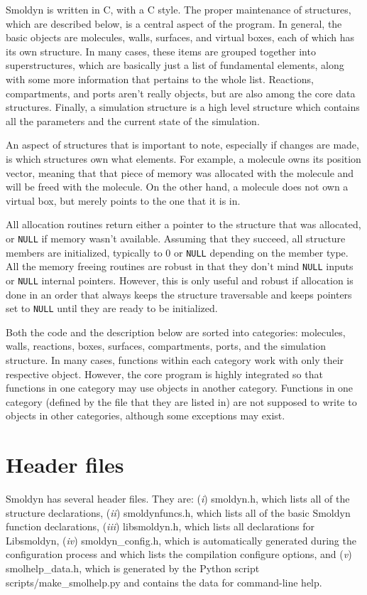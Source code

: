 \documentclass {scrbook}
\newcommand {\ttt} {\texttt}
\begin{document}
Smoldyn is written in C, with a C style. The proper maintenance of structures, which are described below, is a central aspect of the program. In general, the basic objects are molecules, walls, surfaces, and virtual boxes, each of which has its own structure. In many cases, these items are grouped together into superstructures, which are basically just a list of fundamental elements, along with some more information that pertains to the whole list. Reactions, compartments, and ports aren't really objects, but are also among the core data structures. Finally, a simulation structure is a high level structure which contains all the parameters and the current state of the simulation.

An aspect of structures that is important to note, especially if changes are made, is which structures own what elements. For example, a molecule owns its position vector, meaning that that piece of memory was allocated with the molecule and will be freed with the molecule. On the other hand, a molecule does not own a virtual box, but merely points to the one that it is in.

All allocation routines return either a pointer to the structure that was allocated, or \ttt{NULL} if memory wasn't available. Assuming that they succeed, all structure members are initialized, typically to 0 or \ttt{NULL} depending on the member type. All the memory freeing routines are robust in that they don't mind \ttt{NULL} inputs or \ttt{NULL} internal pointers. However, this is only useful and robust if allocation is done in an order that always keeps the structure traversable and keeps pointers set to \ttt{NULL} until they are ready to be initialized.

Both the code and the description below are sorted into categories: molecules, walls, reactions, boxes, surfaces, compartments, ports, and the simulation structure. In many cases, functions within each category work with only their respective object. However, the core program is highly integrated so that functions in one category may use objects in another category. Functions in one category (defined by the file that they are listed in) are not supposed to write to objects in other categories, although some exceptions may exist.

\section{Header files}

Smoldyn has several header files. They are: (\emph{i}) smoldyn.h, which lists all of the structure declarations, (\emph{ii}) smoldynfuncs.h, which lists all of the basic Smoldyn function declarations, (\emph{iii}) libsmoldyn.h, which lists all declarations for Libsmoldyn, (\emph{iv}) smoldyn\_config.h, which is automatically generated during the configuration process and which lists the compilation configure options, and (\emph{v}) smolhelp\_data.h, which is generated by the Python script scripts/make\_smolhelp.py and contains the data for command-line help.
\end{document}
